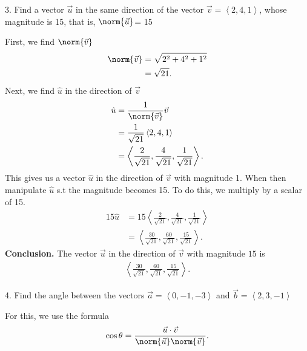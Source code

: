 \documentclass{report}
\begin{document}
    \bigbreak \noindent 
    \begin{mdframed}
        3. Find a vector $\vec{u}$ in the same direction of the vector $\vec{v} = \left\langle 2,4,1 \right\rangle$, whose magnitude is 15, that
        is, $\norm{\vec{u}}$= 15
    \end{mdframed}
    \bigbreak \noindent 
    First, we find $\norm{\vec{v}}$
    \begin{align*}
        \norm{\vec{v}} &= \sqrt{2^{2} + 4^{2} + 1^{2}} \\
        &=\sqrt{21}
    .\end{align*}
    \bigbreak \noindent 
    Next, we find $\hat{u}$ in the direction of $\vec{v}$
    \begin{align*}
        \hat{u} &= \frac{1}{\norm{\vec{v}}}\vec{v} \\
        &=\frac{1}{\sqrt{21}}\left\langle 2,4,1 \right\rangle \\
        &=\left\langle  \frac{2}{\sqrt{21}}, \frac{4}{\sqrt{21}}, \frac{1}{\sqrt{21}} \right\rangle
    .\end{align*}
    \bigbreak \noindent 
    This gives us a vector $\hat{u}$ in the direction of $\vec{v}$ with magnitude 1. When then manipulate $\hat{u}$ s.t the magnitude becomes 15. To do this, we multiply by a scalar of 15.
    \begin{align*}
        15\hat{u} &= 15 \left\langle \frac{2}{\sqrt{21}}, \frac{4}{\sqrt{21}}, \frac{1}{\sqrt{21}} \right\rangle \\
        &= \left\langle \frac{30}{\sqrt{21}}, \frac{60}{\sqrt{21}}, \frac{15}{\sqrt{21}} \right\rangle
    .\end{align*}
    \bigbreak \noindent 
    \textbf{Conclusion.} The vector $\vec{u}$ in the direction of $\vec{v}$ with magnitude $15$ is
    \begin{align*}
        \left\langle \frac{30}{\sqrt{21}}, \frac{60}{\sqrt{21}}, \frac{15}{\sqrt{21}} \right\rangle
    .\end{align*}
    \bigbreak \noindent 
    \begin{mdframed}
        4. Find the angle between the vectors $\vec{a} = \left\langle 0,-1,-3\right\rangle $ and $\vec{b} = \left\langle 2,3,-1 \right\rangle $
    \end{mdframed}
    \bigbreak \noindent 
    For this, we use the formula 
    \begin{align*}
        \cos{\theta } = \frac{\vec{u} \cdot \vec{v}}{\norm{\vec{u}}\norm{\vec{v}}}
    .\end{align*}
    \bigbreak \noindent 
\end{document}
